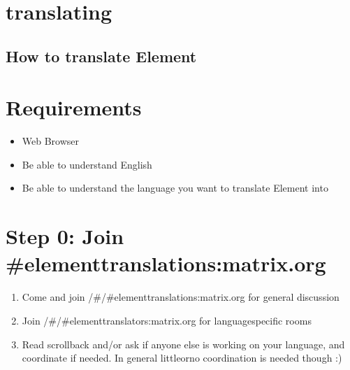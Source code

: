 \documentclass[letterpaper,10pt,openany,oneside,english]{sphinxmanual}
\begin{document}
\chapter{translating}
\label{\detokenize{translating:translating}}\label{\detokenize{translating::doc}}

\section{How to translate Element}
\label{\detokenize{translating:how-to-translate-element}}

\chapter{Requirements}
\label{\detokenize{translating:requirements}}\begin{itemize}
\item {} 
\sphinxAtStartPar
Web Browser

\item {} 
\sphinxAtStartPar
Be able to understand English

\item {} 
\sphinxAtStartPar
Be able to understand the language you want to translate Element into

\end{itemize}


\chapter{Step 0: Join \#element\sphinxhyphen{}translations:matrix.org}
\label{\detokenize{translating:step-0-join-element-translations-matrix-org}}\begin{enumerate}
%
\item {} 
\sphinxAtStartPar
Come and join /\#/\#element\sphinxhyphen{}translations:matrix.org for general discussion

\item {} 
\sphinxAtStartPar
Join /\#/\#element\sphinxhyphen{}translators:matrix.org for language\sphinxhyphen{}specific rooms

\item {} 
\sphinxAtStartPar
Read scrollback and/or ask if anyone else is working on your language, and co\sphinxhyphen{}ordinate if needed.  In general little\sphinxhyphen{}or\sphinxhyphen{}no coordination is needed though :)

\end{enumerate}
\end{document}
